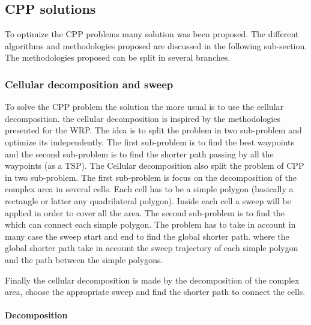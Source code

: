\subsection{CPP solutions}

To optimize the CPP problems many solution was been proposed. The different algorithms and methodologies proposed are discussed in the following sub-section. The methodologies proposed  can be split in several branches.
%
%

\subsubsection{ Cellular decomposition and sweep}
To solve the CPP problem the solution the more usual is to use the cellular decomposition. the cellular decomposition is inspired by the methodologies presented for the WRP.
The idea is to split the problem in two sub-problem and optimize its independently. The first sub-problem is to find the best waypoints and the second sub-problem is to find the shorter path passing by all the waypoints (as a TSP).
 The Cellular decomposition also split the problem of CPP in two sub-problem.  The first sub-problem is focus on the decomposition of the complex area in several cells.  Each cell has to be a simple polygon (basically a rectangle or latter any quadrilateral polygon). Inside each cell a sweep will be applied in order to cover all the area. The second sub-problem is to find the which can connect each simple polygon. The problem has to take in account in  many case the sweep start and end to find the global shorter path. where the global shorter path  take in account the sweep trajectory of each simple polygon and the path between the  simple polygons.
 
 Finally the cellular decomposition is made by the decomposition of the complex area, choose the appropriate  sweep and find the shorter path to connect the cells. 
 
 \paragraph{Decomposition}

